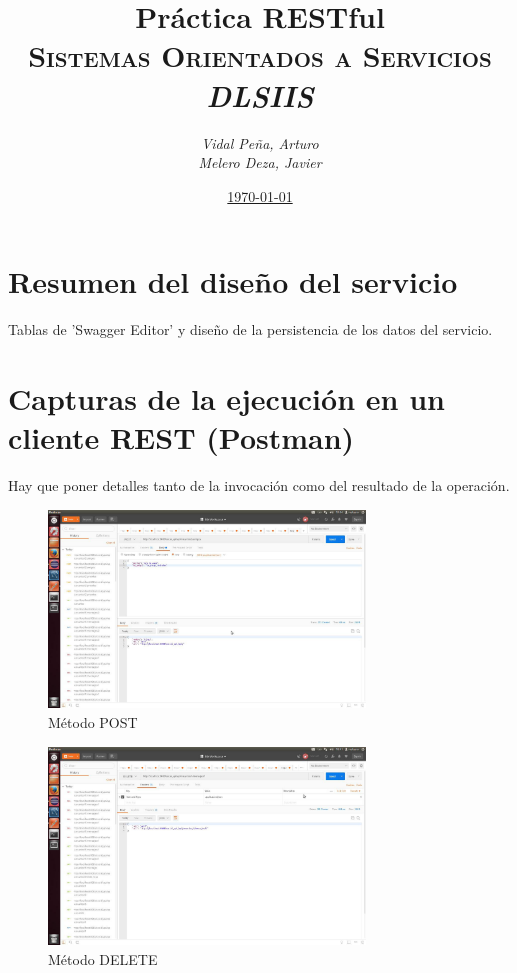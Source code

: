 \documentclass[12pt,a4paper, spanish]{article}
\title{\textbf{Práctica RESTful} \\
       \textsc{Sistemas Orientados a Servicios} \\
       \emph{DLSIIS}}
\author{\emph{Vidal Peña, Arturo}\\
        \emph{Melero Deza, Javier}}
\date{\underline{\today}}
\begin{document}
\maketitle
\thispagestyle{empty}
\renewcommand*\contentsname{Índice de contenidos}
\tableofcontents
\pagebreak


\section{Resumen del diseño del servicio}
Tablas de 'Swagger Editor' y diseño de la persistencia de los datos del servicio.

\newpage
\section{Capturas de la ejecución en un cliente REST (Postman)}
Hay que poner detalles tanto de la invocación como del resultado de la operación.

\begin{figure}[H]
	\centering
	\includegraphics[width=0.75\textwidth]{images/captura1.jpg}
	\caption{Método POST}
\end{figure}

\begin{figure}[H]
	\centering
	\includegraphics[width=0.75\textwidth]{images/captura2.jpg}
	\caption{Método DELETE}
\end{figure}
\end{document}

